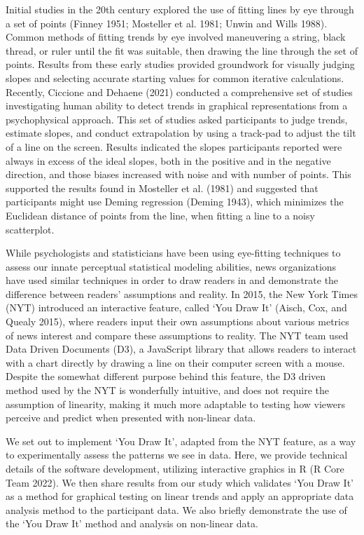\documentclass[
]{jds}
\providecommand{\DIFaddtex}[1]{{\protect\color{blue}\uwave{#1}}} %
\providecommand{\DIFaddbegin}{} %
\providecommand{\DIFaddend}{} %
\providecommand{\DIFadd}[1]{\texorpdfstring{\DIFaddtex{#1}}{#1}} %
\newcommand{\DIFaddincludegraphics}[2][]{{\color{blue}\fbox{\DIFOincludegraphics[#1]{#2}}}} %
\DeclareRobustCommand{\DIFaddbegin}{\DIFOaddbegin \let\includegraphics\DIFaddincludegraphics} %
\DeclareRobustCommand{\DIFaddend}{\DIFOaddend \let\includegraphics\DIFOincludegraphics} %
\begin{document}
Initial studies in the 20th century explored the use of fitting lines by
eye through a set of points (Finney 1951; Mosteller et al. 1981; \DIFaddbegin \DIFadd{A. R.
}\DIFaddend Unwin and Wills 1988). Common methods of fitting trends by eye involved
maneuvering a string, black thread, or ruler until the fit was suitable,
then drawing the line through the set of points. Results from these
early studies provided groundwork for visually judging slopes and
selecting accurate starting values for common iterative calculations.
Recently, Ciccione and Dehaene (2021) conducted a comprehensive set of
studies investigating human ability to detect trends in graphical
representations from a psychophysical approach. This set of studies
asked participants to judge trends, estimate slopes, and conduct
extrapolation by using a track-pad to adjust the tilt of a line on the
screen. Results indicated the slopes participants reported were always
in excess of the ideal slopes, both in the positive and in the negative
direction, and those biases increased with noise and with number of
points. This supported the results found in Mosteller et al. (1981) and
suggested that participants might use Deming regression (Deming 1943),
which minimizes the Euclidean distance of points from the line, when
fitting a line to a noisy scatterplot.

While psychologists and statisticians have been using eye-fitting
techniques to assess our innate perceptual statistical modeling
abilities, news organizations have used similar techniques in order to
draw readers in and demonstrate the difference between readers'
assumptions and reality. In 2015, the New York Times (NYT) introduced an
interactive feature, called `You Draw It' (Aisch, Cox, and Quealy 2015),
where readers input their own assumptions about various metrics of news
interest and compare these assumptions to reality. The NYT team used
Data Driven Documents (D3), a JavaScript library that allows readers to
interact with a chart directly by drawing a line on their computer
screen with a mouse. Despite the somewhat different purpose behind this
feature, the D3 driven method used by the NYT is wonderfully intuitive,
and does not require the assumption of linearity, making it much more
adaptable to testing how viewers perceive and predict when presented
with non-linear data.

We set out to implement `You Draw It', adapted from the NYT feature, as
a way to experimentally assess the patterns we see in data. Here, we
provide technical details of the software development, utilizing
interactive graphics in R (R Core Team 2022). We then share results from
our study which validates `You Draw It' as a method for graphical
testing on linear trends and apply an appropriate data analysis method
to the participant data. We also briefly demonstrate the use of the `You
Draw It' method and analysis on non-linear data.
\end{document}
